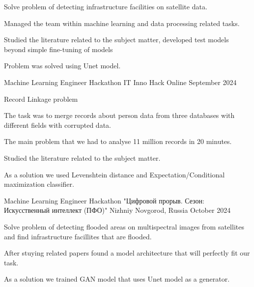 \begin{cventries}
{
  \begin{cvitems} %
    \item {Solve problem of detecting infrastructure facilities on satellite data. }
    \item {Managed the team within machine learning and data processing related tasks. }
    \item {Studied the literature related to the subject matter, developed test models beyond simple fine-tuning of models}
    \item {Problem was solved using Unet model. } 
  \end{cvitems}
}
\cventry
{Machine Learning Engineer} %
{Hackathon IT Inno Hack} %
{Online} %
{September 2024} %
{
  \begin{cvitems} %
    \item {Record Linkage problem}
    \item {The task was to merge records about person data from three databases with different fields with corrupted data. }
    \item {The main problem that we had to analyse 11 million records in 20 minutes. }
    \item {Studied the literature related to the subject matter. }
    \item {As a solution we used Levenshtein distance and Expectation/Conditional maximization classifier. } 
  \end{cvitems}
}
\cventry
{Machine Learning Engineer} %
{Hackathon "Цифровой прорыв. Сезон: Искусственный интеллект (ПФО)"} %
{Nizhniy Novgorod, Russia} %
{October 2024} %
{
  \begin{cvitems} %
    \item {Solve problem of detecting flooded areas on multispectral images from satellites and find infrastructure facillites that are flooded. }
    \item {After stuying related papers found a model architecture that will perfectly fit our task. }
    \item {As a solution we trained GAN model that uses Unet model as a generator. } 
  \end{cvitems}
}
\end{cventries}
